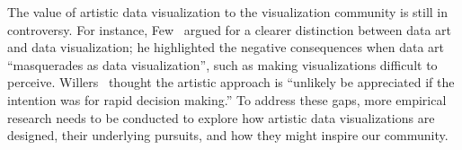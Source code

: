 The value of artistic data visualization to the visualization community is still in controversy. For instance, Few~\cite{few} argued for a clearer distinction between data art and data visualization; he highlighted the negative consequences when data art ``masquerades as data visualization'', such as making visualizations difficult to perceive. Willers~\cite{willers2014show} thought the artistic approach is ``unlikely be appreciated if the intention was for rapid decision making.''
To address these gaps, more empirical research needs to be conducted to explore how artistic data visualizations are designed, their underlying pursuits, and how they might inspire our community.













